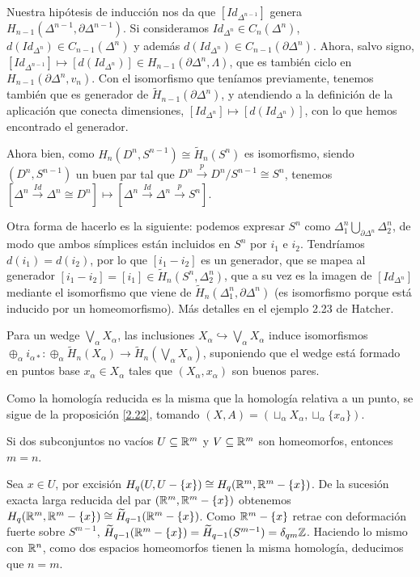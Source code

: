 \documentclass[TA.tex]{subfiles}
\begin{document}
\begin{ej}
Nuestra hipótesis de inducción nos da que $[Id_{\Delta^{n-1}}]$ genera $H_{n-1}(\Delta^{n-1},\partial\Delta^{n-1})$. Si consideramos $Id_{\Delta^n}\in C_n(\Delta^n)$, $d(Id_{\Delta^n})\in C_{n-1}(\Delta^n)$ y además $d(Id_{\Delta^n})\in C_{n-1}(\partial\Delta^n)$. Ahora, salvo signo, $[Id_{\Delta^{n-1}}]\mapsto [d(Id_{\Delta^n})]\in H_{n-1}(\partial\Delta^n,\Lambda)$, que es también ciclo en $H_{n-1}(\partial\Delta^n,v_n)$. Con el isomorfismo que teníamos previamente, tenemos también que es generador de $\widetilde{H}_{n-1}(\partial\Delta^n)$, y atendiendo a la definición de la aplicación que conecta dimensiones, $[Id_{\Delta^n}]\mapsto [d(Id_{\Delta^n})]$, con lo que hemos encontrado el generador. 


Ahora bien, como $H_n(D^n,S^{n-1})\cong \widetilde{H}_n(S^n)$ es isomorfismo, siendo $(D^n,S^{n-1})$ un buen par tal que $D^n\xrightarrow{p}D^n/S^{n-1}\cong S^n$, tenemos $[\Delta^n\xrightarrow{Id}\Delta^n\cong D^n]\mapsto [\Delta^n\xrightarrow{Id}\Delta^n\xrightarrow{p}S^n]$. 

Otra forma de hacerlo es la siguiente: podemos expresar $S^n$ como $\Delta^n_1\bigcup_{\partial\Delta^n}\Delta^n_2$, de modo que ambos símplices están incluidos en $S^n$ por $i_1$ e $i_2$. Tendríamos $d(i_1)=d(i_2)$, por lo que $[i_1-i_2]$ es un generador, que se mapea al generador $[i_1-i_2]=[i_1]\in \widetilde{H}_n(S^n,\Delta^n_2)$, que a su vez es la imagen de $[Id_{\Delta^n}]$ mediante el isomorfismo que viene de $\widetilde{H}_n(\Delta^n_1,\partial\Delta^n)$ (es isomorfismo porque está inducido por un homeomorfismo). Más detalles en el ejemplo 2.23 de Hatcher.
\end{ej}

\begin{coro}
Para un wedge $\bigvee_{\alpha} X_{\alpha}$, las inclusiones $X_{\alpha}\hookrightarrow\bigvee_{\alpha} X_{\alpha}$ induce isomorfismos $\oplus_{\alpha}i_{\alpha *}:\oplus_{\alpha} \widetilde{H}_n(X_{\alpha})\to  \widetilde{H}_n(\bigvee_{\alpha} X_{\alpha})$, suponiendo que el wedge está formado en puntos base $x_{\alpha}\in X_{\alpha}$ tales que $(X_{\alpha},x_{\alpha})$ son buenos pares.
\end{coro}
\begin{dem}
Como la homología reducida es la misma que la homología relativa a un punto, se sigue de la proposición \ref{2.22}, tomando $(X,A)=(\sqcup_{\alpha} X_{\alpha}, \sqcup_{\alpha}\{x_{\alpha}\})$.
\end{dem}

\begin{teorema}
Si dos subconjuntos no vacíos $U\subseteq\mathbb{R}^m$ y $V\subseteq\mathbb{R}^m$ son homeomorfos, entonces $m=n$. 
\end{teorema}
\begin{dem}
Sea $x\in U$, por excisión $H_q(U,U-\{x\})\cong H_q(\mathbb{R}^m, \mathbb{R}^m-\{x\})$. De la sucesión exacta larga reducida del par $(\mathbb{R}^m, \mathbb{R}^m-\{x\})$ obtenemos $H_q(\mathbb{R}^m, \mathbb{R}^m-\{x\})\cong \widetilde{H}_{q-1}(\mathbb{R}^m-\{x\})$. Como $\mathbb{R}^m-\{x\}$ retrae con deformación fuerte sobre $S^{m-1}$, $\widetilde{H}_{q-1}(\mathbb{R}^m-\{x\})=\widetilde{H}_{q-1}(S^{m-1})=\delta_{qm}\mathbb{Z}$. Haciendo lo mismo con $\mathbb{R}^n$, como dos espacios homeomorfos tienen la misma homología, deducimos que $n=m$. 
\end{dem}
\end{document}
